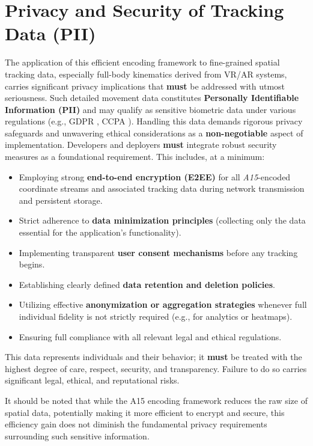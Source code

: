 \documentclass[10pt]{article}
\def\AAAB{\textit{A15}}
\begin{document}
\section{Privacy and Security of Tracking Data (PII)}\label{sec-privacy}

The application of this efficient encoding framework to fine-grained spatial tracking data, especially full-body kinematics derived from VR/AR systems, carries significant privacy implications that \textbf{must} be addressed with utmost seriousness. Such detailed movement data constitutes \textbf{Personally Identifiable Information (PII)} and may qualify as sensitive biometric data under various regulations (e.g., GDPR \cite{GDPR-2016}, CCPA \cite{CCPA-2018}). Handling this data demands rigorous privacy safeguards and unwavering ethical considerations as a \textbf{non-negotiable} aspect of implementation. Developers and deployers \textbf{must} integrate robust security measures as a foundational requirement. This includes, at a minimum:
\begin{itemize} \itemsep0pt
    \item Employing strong \textbf{end-to-end encryption (E2EE)} for all \AAAB{}-encoded coordinate streams and associated tracking data during network transmission and persistent storage.
    \item Strict adherence to \textbf{data minimization principles} (collecting only the data essential for the application's functionality).
    \item Implementing transparent \textbf{user consent mechanisms} before any tracking begins.
    \item Establishing clearly defined \textbf{data retention and deletion policies}.
    \item Utilizing effective \textbf{anonymization or aggregation strategies} whenever full individual fidelity is not strictly required (e.g., for analytics or heatmaps).
    \item Ensuring full compliance with all relevant legal and ethical regulations.
\end{itemize}
This data represents individuals and their behavior; it \textbf{must} be treated with the highest degree of care, respect, security, and transparency. Failure to do so carries significant legal, ethical, and reputational risks.

It should be noted that while the A15 encoding framework reduces the raw size of spatial data, potentially making it more efficient to encrypt and secure, this efficiency gain does not diminish the fundamental privacy requirements surrounding such sensitive information.
\end{document}
